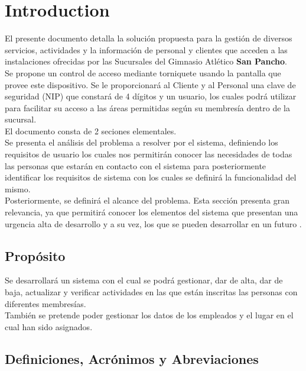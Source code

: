 \chapter*{Introduction}\label{cap.introduccion}
El presente documento detalla la soluci\'on propuesta para la gesti\'on de diversos servicios, actividades y la informaci\'on de personal y clientes que acceden a las instalaciones ofrecidas por las Sucursales del Gimnasio Atl\'etico \textbf{San Pancho}.\\

Se propone un control de acceso mediante torniquete usando la pantalla que provee este dispositivo. Se le proporcionar\'a al Cliente y al Personal una clave de seguridad (NIP) que constar\'a de 4 d\'igitos y un usuario, los cuales podr\'a utilizar para facilitar su acceso a las \'areas permitidas seg\'un su membres\'ia dentro de la sucursal.\\

El documento consta de 2 seciones elementales. \\

Se presenta el an\'alisis del problema a resolver por el sistema, definiendo los requisitos de usuario los cuales nos permitir\'an conocer las necesidades de todas las personas que estar\'an en contacto con el sistema para posteriormente identificar los requisitos de sistema con los cuales se definir\'a la funcionalidad del mismo.\\

Posteriormente, se definir\'a el alcance del problema. Esta secci\'on presenta gran relevancia, ya que permitir\'a conocer los elementos del sistema que presentan una urgencia alta de desarrollo y a su vez, los que se pueden desarrollar en un futuro .

\section{Prop\'osito}
Se desarrollar\'a un sistema con el cual se podr\'a gestionar, dar de alta, dar de baja, actualizar y verificar actividades en las que est\'an inscritas las personas con diferentes membres\'ias. \\
Tambi\'en se pretende poder gestionar los datos de los empleados y el lugar en el cual han sido asignados. 

\section{Definiciones, Acr\'onimos y Abreviaciones}

